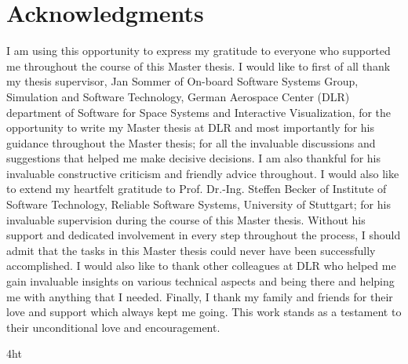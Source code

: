 \documentclass[
               fontsize=12pt, %
               paper=a4,
               twoside, %
               BCOR=3mm, %
               DIV=13,   %
               headinclude=true,
               footinclude=false,
               bibliography=totoc,
               headsepline,
               cleardoublepage=empty,
               parskip=half,
               final   %
               ]{scrbook}
\begin{document}
\section*{Acknowledgments}
I am using this opportunity to express my gratitude to everyone who supported me throughout the course of this Master thesis. I would like to first of all thank my thesis supervisor, Jan Sommer of On-board Software Systems Group, Simulation and Software Technology, German Aerospace Center (DLR) department of Software for Space Systems and Interactive Visualization, for the opportunity to write my Master thesis at DLR and most importantly for his guidance throughout the Master thesis; for all the invaluable discussions and suggestions that helped me make decisive decisions. I am also thankful for his invaluable constructive criticism and friendly advice throughout. I would also like to extend my heartfelt gratitude to Prof. Dr.-Ing. Steffen Becker of Institute of Software Technology, Reliable Software Systems, University of Stuttgart; for his invaluable supervision during the course of this Master thesis. Without his support and dedicated involvement in every step throughout the process, I should admit that the tasks in this Master thesis could never have been successfully accomplished. I would also like to thank other colleagues at DLR who helped me gain invaluable insights on various technical aspects and being there and helping me with anything that I needed. Finally, I thank my family and friends for their love and support which always kept me going. This work stands as a testament to their unconditional love and encouragement. 


\iftex4ht
\else
{}
\fi

%
%

%
%
%
\tableofcontents

\end{document}
